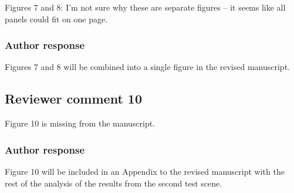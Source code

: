 \documentclass[11pt]{scrartcl}
\providecommand{\DIFadd}[1]{{\protect\textcolor{blue}{\uwave{#1}}}} %
\providecommand{\DIFdel}[1]{{\protect\textcolor{red}{\sout{#1}}}}                      %
\providecommand{\DIFaddFL}[1]{\DIFadd{#1}} %
\providecommand{\DIFdelFL}[1]{\DIFdel{#1}} %
\providecommand{\DIFaddbeginFL}{} %
\providecommand{\DIFaddendFL}{} %
\providecommand{\DIFdelbeginFL}{} %
\providecommand{\DIFdelendFL}{} %
\begin{document}
\begin{itemize}
Figures 7 and 8:  I’m not sure why these are separate figures – it seems like all panels could fit on one page.

\subsubsection*{Author response}

Figures 7 and 8 will be combined into a single figure in the revised
manuscript.

\subsection*{Reviewer comment 10}

Figure 10 is missing from the manuscript.

\subsubsection*{Author response}

Figure 10 will be included in an Appendix to the revised manuscript with the
rest of the analysis of the results from the second test scene.


%


\end{itemize}
\end{document}
